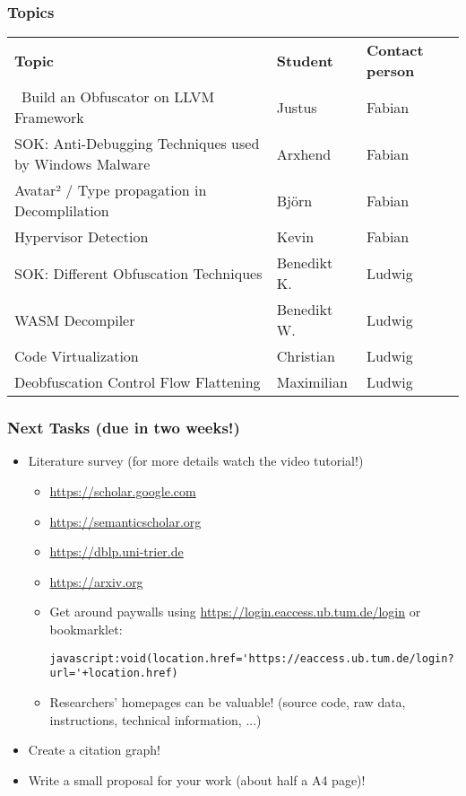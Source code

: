\documentclass{i20lecture}
\begin{document}
\begin{frame}
	\frametitle{Topics}

	\begin{tabular}{lll}
		\textbf{Topic}                 & \textbf{Student} & \textbf{Contact person} \\\
		Build an Obfuscator on LLVM Framework                  & Justus     & Fabian \\
		SOK: Anti-Debugging Techniques used by Windows Malware & Arxhend    & Fabian \\
		Avatar² / Type propagation in Decomplilation            & Björn      & Fabian \\
		Hypervisor Detection                                   & Kevin      & Fabian \\
		SOK: Different Obfuscation Techniques                  & Benedikt K.& Ludwig \\
		WASM Decompiler                                        & Benedikt W.& Ludwig \\
		Code Virtualization                                    & Christian  & Ludwig \\
		Deobfuscation Control Flow Flattening                  & Maximilian & Ludwig \\
	\end{tabular}
\end{frame}

\begin{frame}[fragile]
	\frametitle{Next Tasks (due in two weeks!)}
  \begin{itemize}
	  \item Literature survey (for more details watch the \alert{video tutorial}!)
    \begin{itemize}
      \item \url{https://scholar.google.com}
      \item \url{https://semanticscholar.org}
	  \item \url{https://dblp.uni-trier.de}
      \item \url{https://arxiv.org}
      \item Get around paywalls using
          \url{https://login.eaccess.ub.tum.de/login} or bookmarklet:
          \begin{lstlisting}
javascript:void(location.href='https://eaccess.ub.tum.de/login?url='+location.href)
          \end{lstlisting}
      \item Researchers' homepages can be \alert{valuable}! (source code, raw data, instructions, technical information, ...)
    \end{itemize}
	\item Create a citation graph!
	\item Write a small proposal for your work (about half a A4 page)!
  \end{itemize}
\end{frame}
\end{document}
